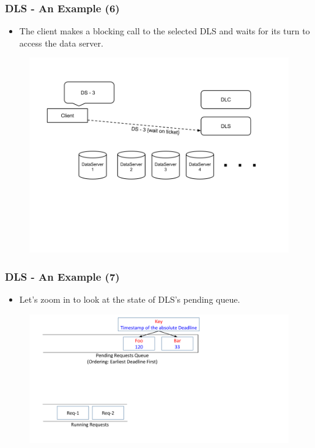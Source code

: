 \documentclass{beamer}
\begin{document}
\begin{frame}
  \frametitle{DLS - An Example (6)}
  \begin{itemize}
  \item The client makes a blocking call to the selected DLS and waits for
    its turn to access the data server.
  \end{itemize}
  \begin{figure}
    \begin{center}
      \centerline{\includegraphics[scale=0.40]{img/DLS_Example7.png}}
    \end{center}
  \end{figure}
\end{frame}

\begin{frame}
  \frametitle{DLS - An Example (7)}
  \begin{itemize}
  \item Let's zoom in to look at the state of DLS's pending queue.
    \newline
    \newline
  \end{itemize}
  \begin{figure}
    \begin{center}
      \centerline{\includegraphics[scale=0.33]{img/DLS_Example8_1.png}}
    \end{center}
  \end{figure}
\end{frame}
\end{document}
